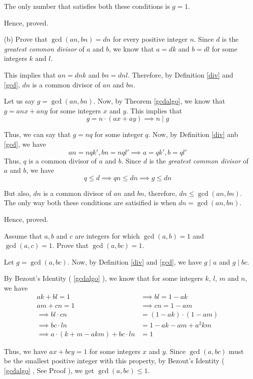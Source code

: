 		The only number that satisfies both these conditions is $g = 1$.

		Hence, proved.
	\es

	(b) Prove that $\gcd(an, bn) = dn$ for every positive integer $n$.
	\bs
		Since $d$ is the \emph{greatest common divisor} of $a$ and $b$, we know that $a = dk$ and $b = dl$ for some integers $k$ and $l$.
		
		This implies that $an = dnk$ and $bn = dnl$. Therefore, by Definition \ref{div} and \ref{gcd}, $dn$ is a common divisor of $an$ and $bn$.

		Let us say $g = \gcd(an,bn)$. Now, by Theorem \ref{gcdalgo}, we know that $g = anx + any$ for some integers $x$ and $y$.
		This implies that $$g = n \cdot (ax + ay) \implies n \mid g$$

		Thus, we can say that $g = nq$ for some integer $q$. Now, by Definition \ref{div} anb \ref{gcd}, we have
		$$an = nqk', bn = nql' \implies a = qk', b = ql'$$
		Thus, $q$ is a common divisor of $a$ and $b$. Since $d$ is the \emph{greatest common divisor} of $a$ and $b$, we have
		$$q \leq d \implies qn \leq dn \implies g \leq dn$$

		But also, $dn$ is a common divisor of $an$ and $bn$, therefore, $dn \leq \gcd(an, bn)$. \\
		The only way both these conditions are satisified is when $dn = \gcd(an, bn)$.

		Hence, proved.
	\es
\ep 


\bp 
	Assume that $a, b$ and $c$ are integers for which $\gcd(a, b) = 1$ and $\gcd(a, c) = 1$. Prove that $\gcd(a, bc) = 1$.
\ep 

\bs
	Let $g = \gcd(a, bc)$. Now, by Definition \ref{div} and \ref{gcd}, we have $g \mid a$ and $g \mid bc$.

	By Bezout's Identity ( \ref{gcdalgo} ), we know that for some integers $k$, $l$, $m$ and $n$, we have 
	\begin{align}
		ak + bl = 1 &\implies bl = 1 - ak \\
		am + cn = 1 &\implies cn = 1 - am \\
		\implies bl \cdot cn &= (1-ak) \cdot (1-am) \\
		\implies bc \cdot ln &= 1 - ak - am +a^2 km \\
		\implies a \cdot(k + m - akm) + bc \cdot ln &= 1
\end{align}
	
Thus, we have $ax + bcy = 1$ for some integers $x$ and $y$.
Since $\gcd(a, bc)$ must be the smallest positive integer with this property, by Bezout's Identity ( \ref{gcdalgo} , See Proof ), we get $\gcd(a, bc) \leq 1$. 

